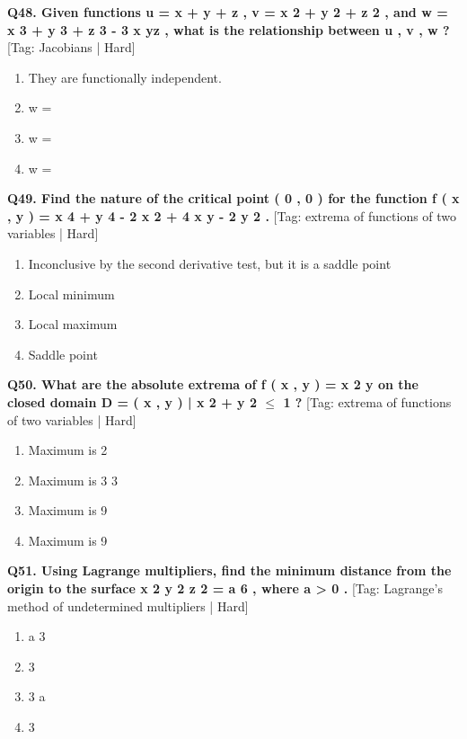 \noindent\textbf{Q48. Given functions u = x + y + z , v = x 2 + y 2 + z 2 , and w = x 3 + y 3 + z 3 - 3 x yz , what is the relationship between u , v , w ?} \hfill [Tag: Jacobians | Hard]
\begin{enumerate}[label=(\alph*),topsep=2pt,itemsep=1pt,partopsep=0pt,parsep=0pt]
    \item {{They are functionally independent.}}
    \item {{w =}}
    \item {{w =}}
    \item {{w =}}
\end{enumerate}
\vspace{2mm}

\noindent\textbf{Q49. Find the nature of the critical point ( 0 , 0 ) for the function f ( x , y ) = x 4 + y 4 - 2 x 2 + 4 x y - 2 y 2 .} \hfill [Tag: extrema of functions of two variables | Hard]
\begin{enumerate}[label=(\alph*),topsep=2pt,itemsep=1pt,partopsep=0pt,parsep=0pt]
    \item {{Inconclusive by the second derivative test, but it is a saddle point}}
    \item {{Local minimum}}
    \item {{Local maximum}}
    \item {{Saddle point}}
\end{enumerate}
\vspace{2mm}

\noindent\textbf{Q50. What are the absolute extrema of f ( x , y ) = x 2 y on the closed domain D = {( x , y ) | x 2 + y 2 $\le$ 1 } ?} \hfill [Tag: extrema of functions of two variables | Hard]
\begin{enumerate}[label=(\alph*),topsep=2pt,itemsep=1pt,partopsep=0pt,parsep=0pt]
    \item {{Maximum is 2}}
    \item {{Maximum is 3 3}}
    \item {{Maximum is 9}}
    \item {{Maximum is 9}}
\end{enumerate}
\vspace{2mm}

\noindent\textbf{Q51. Using Lagrange multipliers, find the minimum distance from the origin to the surface x 2 y 2 z 2 = a 6 , where a > 0 .} \hfill [Tag: Lagrange's method of undetermined multipliers | Hard]
\begin{enumerate}[label=(\alph*),topsep=2pt,itemsep=1pt,partopsep=0pt,parsep=0pt]
    \item {{a 3}}
    \item {{3}}
    \item {{3 a}}
    \item {{3}}
\end{enumerate}
\vspace{2mm}

